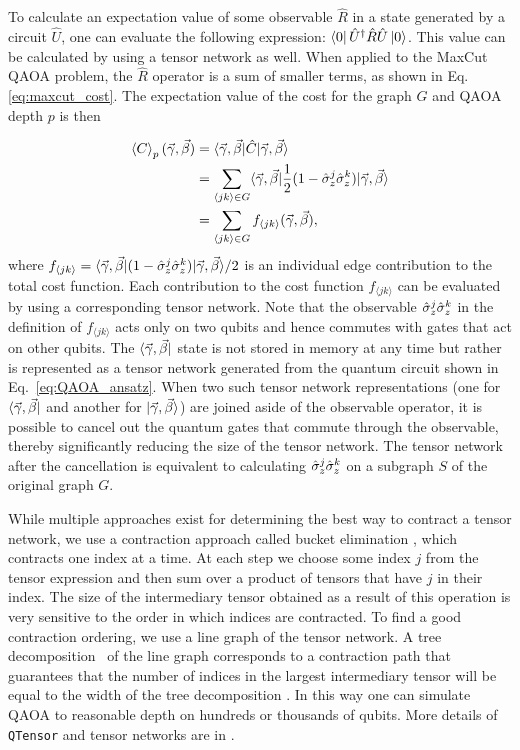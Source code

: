 \documentclass[prb,reprint,nofootinbib,longbibliography,superscriptaddress]{revtex4-1}
\begin{document}
To calculate an expectation value of some observable $\hat R$ in a state generated by a circuit $\hat U$, one can 
evaluate the following expression: $\bra 0 \hat U^\dagger \hat R \hat U \ket 0$.
This value can be calculated by using a tensor network as well.
When applied to the MaxCut QAOA problem, the $\hat R$ operator is a sum of smaller terms, as shown in Eq. \ref{eq:maxcut_cost}.
The expectation value of the cost for the graph $G$ and QAOA depth $p$ is then


\begin{align*}
\braket{C}_p({\vec{\gamma}, \vec{\beta}}) &= \braket{{\vec{\gamma}, \vec{\beta}}| \hat C | {\vec{\gamma}, \vec{\beta}}} 
\\
&=  \sum_{\langle jk\rangle\in G}\langle{\vec{\gamma}, \vec{\beta}}|\frac{1}{2}(1-{\hat\sigma_z}^j{\hat\sigma_z}^k)|{\vec{\gamma}, \vec{\beta}}\rangle
\\
&=\sum_{\langle jk\rangle\in G}f_{\langle jk\rangle}({\vec{\gamma}, \vec{\beta}}),
\end{align*}
where $f_{\langle jk\rangle}=\langle{\vec{\gamma}, \vec{\beta}}|(1-{\hat\sigma_z}^j{\hat\sigma_z}^k)|{\vec{\gamma}, \vec{\beta}}\rangle/2$ is an individual edge contribution to the total cost function.
Each contribution to the cost function $f_{\langle jk\rangle}$ can be evaluated by using a corresponding tensor network.
Note that the observable ${\hat\sigma_z}^j{\hat\sigma_z}^k$ in the definition of $f_{\langle jk\rangle}$
acts only on two qubits and hence commutes with gates that 
act on other qubits.
The $\bra {{\vec{\gamma}, \vec{\beta}}}$ state is not stored in memory at any time but rather is represented as a tensor network generated from the quantum circuit
shown in Eq.~\ref{eq:QAOA_ansatz}.
When two such tensor network representations (one for $\bra {{\vec{\gamma}, \vec{\beta}}}$ and another for $\ket {{\vec{\gamma}, \vec{\beta}}}$) are joined aside of the observable operator, it is possible
to cancel out the quantum gates that commute through the observable, thereby  significantly reducing the size of the tensor network.
The tensor network after the cancellation is equivalent to calculating ${\hat\sigma_z}^j{\hat\sigma_z}^k$ on a subgraph $S$ of the original graph $G$. 

While  multiple approaches exist for determining the best way to contract a tensor network, we use a contraction approach called bucket elimination \cite{detcher2013bucket}, which contracts one index at a time. At each step we choose some index $j$ from the tensor expression and then sum over a product of tensors that have $j$ in their index. The size of the intermediary tensor obtained as a result of this operation is very sensitive to the order in which indices are contracted.
To find a good contraction ordering, we use a line graph of the tensor network.
A tree decomposition~\cite{harvey2018treewidth} of the line graph corresponds to a contraction path that guarantees that the number of indices in the largest intermediary tensor will be equal to the width of the tree decomposition \cite{markov2008simulating}.
In this way one can simulate QAOA to reasonable depth on hundreds or thousands of qubits. More details of \texttt{QTensor} and tensor networks are in \cite{shutski2019adaptive, lykov2021large, Gray_Cotengra}.
\end{document}
